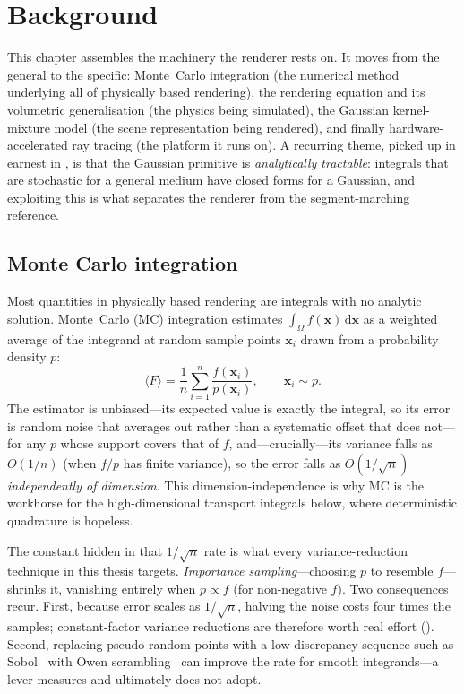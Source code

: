 \chapter{Background}
\label{ch:background}

This chapter assembles the machinery the renderer rests on. It moves from the general to the
specific: Monte~Carlo integration (the numerical method underlying all of physically based
rendering), the rendering equation and its volumetric generalisation (the physics being
simulated), the Gaussian kernel-mixture model (the scene representation being rendered), and
finally hardware-accelerated ray tracing (the platform it runs on). A recurring theme, picked up
in earnest in , is that the Gaussian primitive is \emph{analytically
tractable}: integrals that are stochastic for a general medium have closed forms for a Gaussian,
and exploiting this is what separates the renderer from the segment-marching reference.

\section{Monte Carlo integration}
\label{sec:monte-carlo}

Most quantities in physically based rendering are integrals with no analytic solution. Monte~Carlo
(MC) integration estimates $\int_{\Omega} f(\bm{x})\,\mathrm{d}\bm{x}$ as a weighted average of the
integrand at random sample points $\bm{x}_i$ drawn from a probability density $p$:
\[
  \langle F \rangle = \frac{1}{n}\sum_{i=1}^{n} \frac{f(\bm{x}_i)}{p(\bm{x}_i)},
  \qquad \bm{x}_i \sim p .
\]
The estimator is unbiased---its expected value is exactly the integral, so its error is random noise
that averages out rather than a systematic offset that does not---for any $p$ whose support covers that
of $f$, and---crucially---its variance falls as $O(1/n)$ (when $f/p$ has finite variance), so the error falls as $O(1/\sqrt{n})$ \emph{independently of
dimension}. This dimension-independence is why MC is the workhorse for the high-dimensional
transport integrals below, where deterministic quadrature is hopeless.

The constant hidden in that $1/\sqrt{n}$ rate is what every variance-reduction technique in this
thesis targets. \emph{Importance sampling}---choosing $p$ to resemble $f$---shrinks it, vanishing
entirely when $p \propto f$ (for non-negative $f$). Two consequences recur. First, because error scales as $1/\sqrt{n}$,
halving the noise costs four times the samples; constant-factor variance reductions are therefore
worth real effort (). Second, replacing pseudo-random points with a
low-discrepancy sequence such as Sobol~\cite{Sobol1967} with Owen scrambling~\cite{Owen1998} can
improve the rate for smooth integrands---a lever  measures and ultimately
does not adopt.

